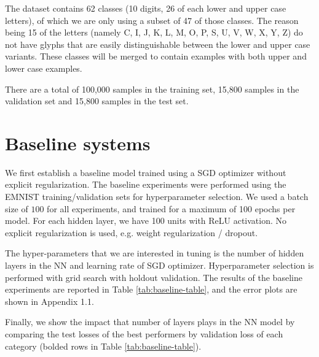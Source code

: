 \documentclass{article}
\begin{document}
The dataset contains 62 classes (10 digits, 26 of each lower and upper case letters), of which we are only using a subset of 47 of those classes. The reason being 15 of the letters (namely C, I, J, K, L, M, O, P, S, U, V, W, X, Y, Z) do not have glyphs that are easily distinguishable between the lower and upper case variants. These classes will be merged to contain examples with both upper and lower case examples.	

There are a total of 100,000 samples in the training set, 15,800 samples in the validation set and 15,800 samples in the test set.

\section{Baseline systems} 
We first establish a baseline model trained using a SGD optimizer without explicit regularization. The baseline experiments were performed using the EMNIST training/validation sets for hyperparameter selection. We used a batch size of $100$ for all experiments, and trained for a maximum of 100 epochs per model. For each hidden layer, we have 100 units with ReLU activation. No explicit regularization is used, e.g. weight regularization / dropout. 

The hyper-parameters that we are interested in tuning is the number of hidden layers in the NN and learning rate of SGD optimizer. Hyperparameter selection is performed with grid search with holdout validation.  The results of the baseline experiments are reported in Table \ref{tab:baseline-table}, and the error plots are shown in Appendix 1.1.

Finally, we show the impact that number of layers plays in the NN model by comparing the test losses of the best performers by validation loss of each category (bolded rows in Table \ref{tab:baseline-table}).
\end{document}
